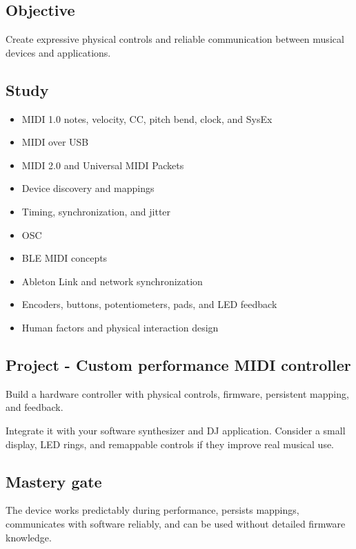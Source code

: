\documentclass[11pt,letterpaper]{article}
\begin{document}
\subsection*{Objective}\label{objective-6}

Create expressive physical controls and reliable communication between musical devices and applications.

\subsection*{Study}\label{study-3}

\begin{itemize}
\item MIDI 1.0 notes, velocity, CC, pitch bend, clock, and SysEx
\item MIDI over USB
\item MIDI 2.0 and Universal MIDI Packets
\item Device discovery and mappings
\item Timing, synchronization, and jitter
\item OSC
\item BLE MIDI concepts
\item Ableton Link and network synchronization
\item Encoders, buttons, potentiometers, pads, and LED feedback
\item Human factors and physical interaction design
\end{itemize}

\subsection*{Project - Custom performance MIDI controller}\label{project-custom-performance-midi-controller}

Build a hardware controller with physical controls, firmware, persistent mapping, and feedback.

Integrate it with your software synthesizer and DJ application. Consider a small display, LED rings, and remappable controls if they improve real musical use.

\subsection*{Mastery gate}\label{mastery-gate-6}

The device works predictably during performance, persists mappings, communicates with software reliably, and can be used without detailed firmware knowledge.
\end{document}
